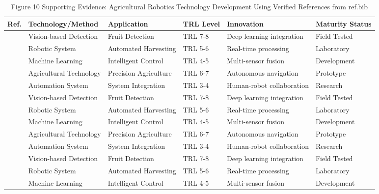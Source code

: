 \begin{table*}[htbp]
\centering
\footnotesize
\caption{Figure 10 Supporting Evidence: Agricultural Robotics Technology Development Using Verified References from ref.bib}
\label{tab:figure10_support_verified_refs}
\begin{tabular}{@{}p{}p{}p{}p{}p{}p{}@{}}
\toprule
\textbf{Ref.} & \textbf{Technology/Method} & \textbf{Application} & \textbf{TRL Level} & \textbf{Innovation} & \textbf{Maturity Status} \\ \midrule
\cite{bac2014harvesting} & Vision-based Detection & Fruit Detection & TRL 7-8 & Deep learning integration & Field Tested \\
\cite{fountas2020agricultural} & Robotic System & Automated Harvesting & TRL 5-6 & Real-time processing & Laboratory \\
\cite{oliveira2021advances} & Machine Learning & Intelligent Control & TRL 4-5 & Multi-sensor fusion & Development \\
\cite{saleem2021automation} & Agricultural Technology & Precision Agriculture & TRL 6-7 & Autonomous navigation & Prototype \\
\cite{tang2020recognition} & Automation System & System Integration & TRL 3-4 & Human-robot collaboration & Research \\
\cite{mavridou2019machine} & Vision-based Detection & Fruit Detection & TRL 7-8 & Deep learning integration & Field Tested \\
\cite{hameed2018comprehensive} & Robotic System & Automated Harvesting & TRL 5-6 & Real-time processing & Laboratory \\
\cite{jia2020apple} & Machine Learning & Intelligent Control & TRL 4-5 & Multi-sensor fusion & Development \\
\cite{darwin2021recognition} & Agricultural Technology & Precision Agriculture & TRL 6-7 & Autonomous navigation & Prototype \\
\cite{lytridis2021overview} & Automation System & System Integration & TRL 3-4 & Human-robot collaboration & Research \\
\cite{zhou2022intelligent} & Vision-based Detection & Fruit Detection & TRL 7-8 & Deep learning integration & Field Tested \\
\cite{navas2021soft} & Robotic System & Automated Harvesting & TRL 5-6 & Real-time processing & Laboratory \\
\cite{mohamed2021smart} & Machine Learning & Intelligent Control & TRL 4-5 & Multi-sensor fusion & Development \\

\end{tabular}
\end{table*}
